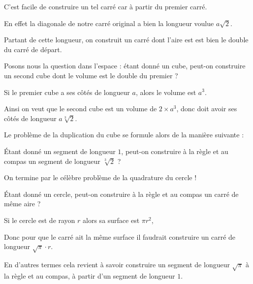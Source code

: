 \change
C'est facile de construire un tel carré car à partir du premier carré.

En effet la diagonale de notre carré original 
a bien la longueur voulue $a\sqrt 2$. 

Partant de cette longueur, on construit un carré dont l'aire est
est bien le double du carré de départ.


\diapo

Posons nous la question dans l'espace : étant donné un cube, peut-on construire
un second cube dont le volume est le double du premier ?

\change
Si le premier cube a ses côtés de longueur $a$, alors le volume est $a^3$. 

\change
Ainsi on veut que le second cube est un volume de $2 \times a^3$, donc doit
avoir ses côtés de longueur $a\sqrt[3]{2}$. 

\change
Le problème de la duplication du cube se formule alors de la manière suivante :


\'Etant donné un segment de longueur $1$, peut-on 
construire à la règle et au compas 
un segment de longueur $\sqrt[3]{2}$ ?

\diapo

On termine par le célèbre problème de la quadrature du cercle !


\'Etant donné un cercle, 
peut-on construire à la règle et au compas 
un carré de même aire ?


Si le cercle est de rayon $r$ alors sa surface est $\pi r^2$,

Donc pour que le carré ait la même surface il faudrait construire
un carré de longueur $\sqrt{\pi} \cdot r$.

\change
En d'autres termes cela revient à savoir construire un segment de 
longueur $\sqrt{\pi}$ à la règle et au compas, à
partir d'un segment de longueur $1$.


